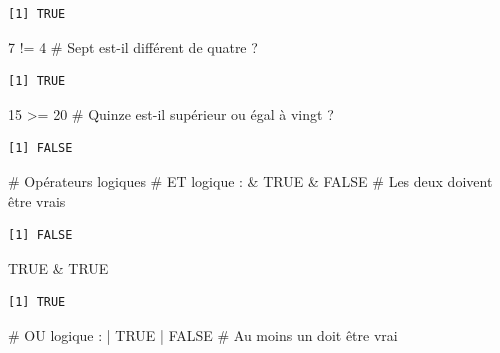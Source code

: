 \documentclass[
  french,
  11pt,
  a4paper,
]{article}
\newenvironment{Shaded}{}{}
\newcommand{\CommentTok}[1]{\textcolor[rgb]{0.42,0.45,0.49}{#1}}
\newcommand{\ConstantTok}[1]{\textcolor[rgb]{0.00,0.36,0.77}{#1}}
\newcommand{\DecValTok}[1]{\textcolor[rgb]{0.00,0.36,0.77}{#1}}
\newcommand{\SpecialCharTok}[1]{\textcolor[rgb]{0.00,0.36,0.77}{#1}}
\begin{document}
\begin{verbatim}
[1] TRUE
\end{verbatim}

\begin{Shaded}
\begin{Highlighting}[]
\DecValTok{7} \SpecialCharTok{!=} \DecValTok{4}      \CommentTok{\# Sept est{-}il différent de quatre ?}
\end{Highlighting}
\end{Shaded}

\begin{verbatim}
[1] TRUE
\end{verbatim}

\begin{Shaded}
\begin{Highlighting}[]
\DecValTok{15} \SpecialCharTok{\textgreater{}=} \DecValTok{20}    \CommentTok{\# Quinze est{-}il supérieur ou égal à vingt ?}
\end{Highlighting}
\end{Shaded}

\begin{verbatim}
[1] FALSE
\end{verbatim}

\begin{Shaded}
\begin{Highlighting}[]
\CommentTok{\# Opérateurs logiques}
\CommentTok{\# ET logique : \&}
\ConstantTok{TRUE} \SpecialCharTok{\&} \ConstantTok{FALSE}    \CommentTok{\# Les deux doivent être vrais}
\end{Highlighting}
\end{Shaded}

\begin{verbatim}
[1] FALSE
\end{verbatim}

\begin{Shaded}
\begin{Highlighting}[]
\ConstantTok{TRUE} \SpecialCharTok{\&} \ConstantTok{TRUE}
\end{Highlighting}
\end{Shaded}

\begin{verbatim}
[1] TRUE
\end{verbatim}

\begin{Shaded}
\begin{Highlighting}[]
\CommentTok{\# OU logique : |}
\ConstantTok{TRUE} \SpecialCharTok{|} \ConstantTok{FALSE}    \CommentTok{\# Au moins un doit être vrai}
\end{Highlighting}
\end{Shaded}
\end{document}
